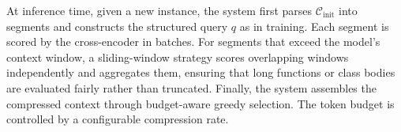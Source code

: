 \documentclass[sigconf,nonacm]{acmart}
\newcommand{\eg}{\textit{e.g.},~}
\begin{document}
At inference time, given a new instance, the system first parses $\mathcal{C}_\mathrm{init}$ into segments and constructs the structured query $q$ as in training. Each segment is scored by the cross-encoder in batches. For segments that exceed the model's context window, a sliding-window strategy scores overlapping windows independently and aggregates them, ensuring that long functions or class bodies are evaluated fairly rather than truncated. Finally, the system assembles the compressed context through budget-aware greedy selection. The token budget is controlled by a configurable compression rate.

\end{document}

